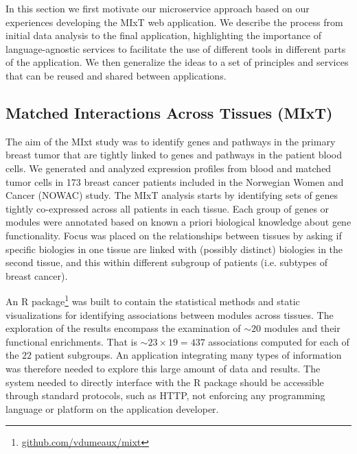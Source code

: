 
In this section we first motivate our microservice approach based on our
experiences developing the MIxT web application.
We describe the process from initial data analysis to the final application,
highlighting the importance
of language-agnostic services to facilitate the use of different tools in
different parts of the application. 
We then generalize the ideas to a set
of principles and services that can be reused and shared between applications. 

\subsection*{Matched Interactions Across Tissues (MIxT)} 
The aim of the MIxt study was to identify genes and pathways in the primary
breast tumor that are tightly linked to genes and pathways in the patient blood
cells. We generated and analyzed expression profiles from blood and matched
tumor cells in 173 breast cancer patients included in the Norwegian Women and
Cancer (NOWAC) study.\cite{vanessa}
The MIxT analysis starts by identifying sets of genes tightly co-expressed
across all patients in each tissue. Each group of genes or modules were
annotated based on known a priori biological knowledge about gene functionality.
Focus was placed on the relationships between tissues by asking if specific
biologies in one tissue are linked with (possibly distinct) biologies in the
second tissue, and this within different subgroup of patients (i.e. subtypes of
breast cancer).

An R package\footnote{\url{github.com/vdumeaux/mixt}} was built to contain the
statistical methods and static visualizations for identifying associations
between modules across tissues. The exploration of the results encompass the
examination  of $\sim20$ modules and their functional enrichments.  That is
$\sim23\times19=437$ associations computed for each of the $22$ patient
subgroups. 
An application integrating many types of information was therefore needed to
explore this large amount of data and results.
The system needed to directly interface with the R package should be accessible
through standard protocols, such as HTTP, not enforcing any programming language
or platform on the application developer. 

